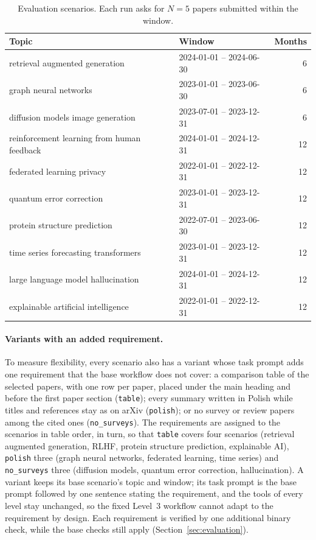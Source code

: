 \begin{table}[t]
  \caption{Evaluation scenarios. Each run asks for $N=5$ papers submitted within the window.}
  \label{tab:scenarios}
  \centering
  \small
  \begin{tabular}{@{}llr@{}}
    \toprule
    Topic & Window & Months \\
    \midrule
    retrieval augmented generation & 2024-01-01 -- 2024-06-30 & 6 \\
    graph neural networks & 2023-01-01 -- 2023-06-30 & 6 \\
    diffusion models image generation & 2023-07-01 -- 2023-12-31 & 6 \\
    reinforcement learning from human feedback & 2024-01-01 -- 2024-12-31 & 12 \\
    federated learning privacy & 2022-01-01 -- 2022-12-31 & 12 \\
    quantum error correction & 2023-01-01 -- 2023-12-31 & 12 \\
    protein structure prediction & 2022-07-01 -- 2023-06-30 & 12 \\
    time series forecasting transformers & 2023-01-01 -- 2023-12-31 & 12 \\
    large language model hallucination & 2024-01-01 -- 2024-12-31 & 12 \\
    explainable artificial intelligence & 2022-01-01 -- 2022-12-31 & 12 \\
    \bottomrule
  \end{tabular}
\end{table}

\paragraph{Variants with an added requirement.}
To measure flexibility, every scenario also has a variant whose task prompt adds one requirement that the base workflow does not cover: a comparison table of the selected papers, with one row per paper, placed under the main heading and before the first paper section (\texttt{table}); every summary written in Polish while titles and references stay as on arXiv (\texttt{polish}); or no survey or review papers among the cited ones (\texttt{no\_surveys}). The requirements are assigned to the scenarios in table order, in turn, so that \texttt{table} covers four scenarios (retrieval augmented generation, RLHF, protein structure prediction, explainable AI), \texttt{polish} three (graph neural networks, federated learning, time series) and \texttt{no\_surveys} three (diffusion models, quantum error correction, hallucination). A variant keeps its base scenario's topic and window; its task prompt is the base prompt followed by one sentence stating the requirement, and the tools of every level stay unchanged, so the fixed Level~3 workflow cannot adapt to the requirement by design. Each requirement is verified by one additional binary check, while the base checks still apply (Section~\ref{sec:evaluation}).

